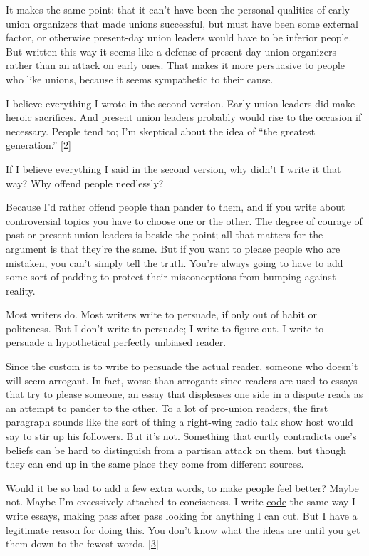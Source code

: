 It makes the same point: that it can't have been the personal qualities
of early union organizers that made unions successful, but must have
been some external factor, or otherwise present-day union leaders would
have to be inferior people. But written this way it seems like a defense
of present-day union organizers rather than an attack on early ones.
That makes it more persuasive to people who like unions, because it
seems sympathetic to their cause.

I believe everything I wrote in the second version. Early union leaders
did make heroic sacrifices. And present union leaders probably would
rise to the occasion if necessary. People tend to; I'm skeptical about
the idea of ``the greatest generation.'' {[}\hyperref[f2n]{2}{]}

If I believe everything I said in the second version, why didn't I write
it that way? Why offend people needlessly?

Because I'd rather offend people than pander to them, and if you write
about controversial topics you have to choose one or the other. The
degree of courage of past or present union leaders is beside the point;
all that matters for the argument is that they're the same. But if you
want to please people who are mistaken, you can't simply tell the truth.
You're always going to have to add some sort of padding to protect their
misconceptions from bumping against reality.

Most writers do. Most writers write to persuade, if only out of habit or
politeness. But I don't write to persuade; I write to figure out. I
write to persuade a hypothetical perfectly unbiased reader.

Since the custom is to write to persuade the actual reader, someone who
doesn't will seem arrogant. In fact, worse than arrogant: since readers
are used to essays that try to please someone, an essay that displeases
one side in a dispute reads as an attempt to pander to the other. To a
lot of pro-union readers, the first paragraph sounds like the sort of
thing a right-wing radio talk show host would say to stir up his
followers. But it's not. Something that curtly contradicts one's beliefs
can be hard to distinguish from a partisan attack on them, but though
they can end up in the same place they come from different sources.

Would it be so bad to add a few extra words, to make people feel better?
Maybe not. Maybe I'm excessively attached to conciseness. I write
\href{power.html}{code} the same way I write essays, making pass after
pass looking for anything I can cut. But I have a legitimate reason for
doing this. You don't know what the ideas are until you get them down to
the fewest words. {[}\hyperref[f3n]{3}{]}

